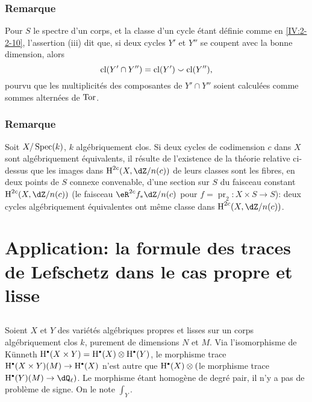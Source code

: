 \subsubsection{Remarque}\label{IV:2-3-9}

Pour $S$ le spectre d'un corps, et la classe d'un cycle étant définie comme 
en \ref{IV:2-2-10}, l'assertion (iii) dit que, si deux cycles $Y'$ et $Y''$ se 
coupent avec la bonne dimension, alors 
\[
  \operatorname{cl}(Y'\cap Y'') = \operatorname{cl}(Y')\smallsmile \operatorname{cl}(Y'')\text{,}
\]
pourvu que les multiplicités des composantes de $Y'\cap Y''$ soient 
calculées comme sommes alternées de $\operatorname{Tor}$. 





\subsubsection{Remarque}\label{IV:2-3-10}

Soit $X/\operatorname{Spec}(k)$, $k$ algébriquement clos. Si deux cycles de codimension $c$ 
dans $X$ sont algébriquement équivalents, il résulte de l'existence de la 
théorie relative ci-dessus que les images dans $\h^{2 c}(X,\dZ/n(c))$ de 
leurs classes sont les fibres, en deux points de $S$ connexe convenable, d'une 
section sur $S$ du faisceau constant $\h^{2 c}(X,\dZ/n(c))$ (le faisceau 
$\eR^{2 c} f_\ast \dZ/n(c)$ pour $f=\operatorname{pr}_2:X\times S\to S$): deux 
cycles algébriquement équivalentes ont même classe dans 
$\h^{2 c}(X,\dZ/n(c))$. 




















\section{Application: la formule des traces de Lefschetz dans le cas propre et lisse}\label{IV:3}





\subsection{}\label{IV:3-1}

Soient $X$ et $Y$ des variétés algébriques propres et lisses sur un corps 
algébriquement clos $k$, purement de dimensions $N$ et $M$. Via 
l'isomorphisme de K\"unneth 
$\h^\bullet(X\times Y)=\h^\bullet(X)\otimes \h^\bullet(Y)$, le morphisme trace 
$\h^\bullet(X\times Y)(M)\to \h^\bullet(X)$ n'est autre que 
$\h^\bullet(X)\otimes ($le morphisme trace $\h^\bullet(Y)(M)\to \dQ_\ell)$. Le 
morphisme étant homogène de degré pair, il n'y a pas de problème de 
signe. On le note $\int_Y$. 





